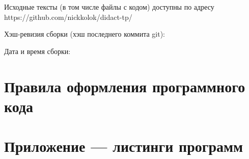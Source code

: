 
\LARGE




Исходные тексты (в том числе файлы с кодом) доступны по адресу https://github.com/nickkolok/didact-tp/

Хэш-ревизия сборки (хэш последнего коммита git):


Дата и время сборки:







\newpage
\chapter*{Правила оформления программного кода}



\newpage
\chapter*{Приложение --- листинги программ}



